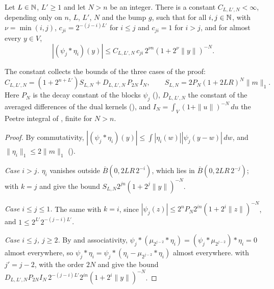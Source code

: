 \begin{theorem}
\label{thm:cross-kernel-dual}
\leanok
{}
Let $L \in \mathbb{N}$, $L' \geq 1$ and let $N > n$ be an integer. There is a constant
$C_{L,L',N} < \infty$, depending only on $n$, $L$, $L'$, $N$ and the bump $g$, such that for all
$i, j \in \mathbb{N}$, with $\nu = \min(i, j)$, $c_{ji} = 2^{-(j-i)L'}$ for $i \leq j$ and $c_{ji} = 1$
for $i > j$, and for almost every $y \in V$,
\[
  |(\psi_j * \eta_i)(y)| \leq C_{L,L',N} \, c_{ji} \, 2^{\nu n} (1 + 2^\nu \|y\|)^{-N} .
\]
\end{theorem}

The constant collects the bounds of the three cases of the proof:
\[
  C_{L,L',N} = (1 + 2^{n + L'}) S_{L,N} + D_{L,L',N} \, P_{2N} \, I_N , \qquad
  S_{L,N} = 2 P_N (1 + 2LR)^N \|m\|_1 .
\]
Here $P_N$ is the decay constant of the blocks $\psi_j$ (),
$D_{L,L',N}$ the constant of the averaged differences of the dual kernels
(), and $I_N = \int_V (1 + \|u\|)^{-N} \, du$ the Peetre
integral of , finite for $N > n$.

\begin{proof}
\leanok
By commutativity, $|(\psi_j * \eta_i)(y)| \leq \int |\eta_i(w)| |\psi_j(y - w)| \, dw$, and
$\|\eta_i\|_1 \leq 2 \|m\|_1$ ().

\emph{Case $i > j$.} $\eta_i$ vanishes outside $\overline B(0, 2LR \, 2^{-i})$, which lies in
$\overline B(0, 2LR \, 2^{-j})$;  with $k = j$ and
 give the bound $S_{L,N} 2^{jn} (1 + 2^j \|y\|)^{-N}$.

\emph{Case $i \leq j \leq 1$.} The same with $k = i$, since
$|\psi_j(z)| \leq 2^n P_N 2^{in} (1 + 2^i \|z\|)^{-N}$, and $1 \leq 2^{L'} 2^{-(j-i)L'}$.

\emph{Case $i \leq j$, $j \geq 2$.} By  and associativity,
$\psi_j * (\mu_{2^{j-2}} * \eta_i) = (\psi_j * \mu_{2^{j-2}}) * \eta_i = 0$ almost everywhere,
so $\psi_j * \eta_i = \psi_j * (\eta_i - \mu_{2^{j-2}} * \eta_i)$ almost everywhere.
 with $j' = j - 2$,  with the
order $2N$ and  give the bound
$D_{L,L',N} P_{2N} I_N \, 2^{-(j-i)L'} 2^{in} (1 + 2^i \|y\|)^{-N}$.
\end{proof}

